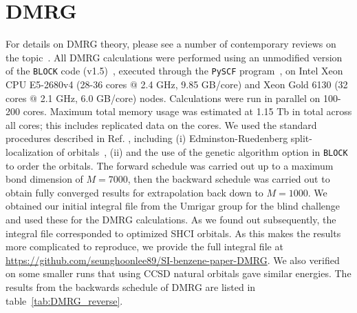 \documentclass[journal=jcp,manuscript=suppinfo]{achemso}
\begin{document}
\section{DMRG}

For details on DMRG theory, please see a number of contemporary reviews on the topic~\cite{chan_dmrg_2011,wouters_dmrg_2014,knecht_dmrg_2016}. All DMRG calculations were performed using an unmodified version of the {\texttt{BLOCK}} code (v1.5)~\cite{chan_head_gordon_dmrg_jcp_2002,chan_dmrg_jcp_2004,chan_polyacetylenes_jcp_2008,sharma_chan_dmrg_2012,chan_dmrg_2015}, executed through the {\texttt{PySCF}} program~\cite{pyscf_prog,pyscf_wires_2018,pyscf_jcp_2020}, on Intel Xeon CPU E5-2680v4 (28-36 cores $@$ 2.4 GHz, 9.85 GB/core) and Xeon Gold 6130 (32 cores $@$ 2.1 GHz, 6.0 GB/core) nodes. Calculations were run in parallel on 100-200 cores. Maximum total memory usage was estimated at 1.15 Tb in total across all cores; this includes
replicated data on the cores. We used the standard procedures described in Ref. , including (i) Edminston-Ruedenberg split-localization of orbitals~\cite{edmiston_ruedenberg_rev_mod_phys_1963}, (ii) and the use of the genetic algorithm option in \texttt{BLOCK} to order the orbitals. The forward schedule was carried out up to a maximum bond dimension of $M=7000$, then the backward schedule was carried out to obtain fully converged results for extrapolation back down to $M=1000$.
We obtained our initial integral file from the Umrigar group for the blind challenge and used these for the DMRG calculations.
As we found out subsequently, the integral file corresponded to optimized SHCI orbitals. As this makes the results more complicated to reproduce,
we provide the full integral file at \url{https://github.com/seunghoonlee89/SI-benzene-paper-DMRG}. We also
verified on some smaller runs that using CCSD natural orbitals gave similar energies. The results from the backwards schedule of DMRG are listed in table~\ref{tab:DMRG_reverse}.\\
\end{document}
